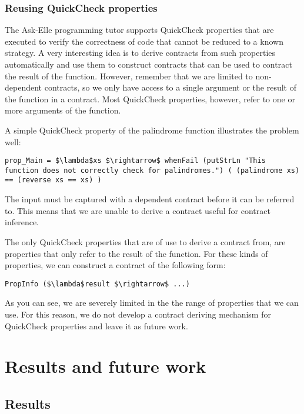 \documentclass[10pt]{report}
\newcommand{\code}[1]{%
  {%
   \setlength{\fboxsep}{-2\fboxrule}%
   \fcolorbox{black}{light-gray}{\hspace{1.5pt}\strut\texttt{#1}\hspace{1.5pt}}%
  }%
}
\begin{document}
{\subsection{Reusing QuickCheck properties}
\label{subsection:reusing-qc-props}

The Ask-Elle programming tutor supports QuickCheck properties that are executed to verify the correctness of code that cannot be reduced to a known strategy.
A very interesting idea is to derive contracts from such properties automatically and use them to construct contracts that can be used to contract the result of the function.
However, remember that we are limited to non-dependent contracts, so we only have access to a single argument or the result of the function in a contract.
Most QuickCheck properties, however, refer to one or more arguments of the function.

A simple QuickCheck property of the palindrome function illustrates the problem well:

\begin{lstlisting}[mathescape]
prop_Main = $\lambda$xs $\rightarrow$ whenFail (putStrLn "This function does not correctly check for palindromes.") ( (palindrome xs) == (reverse xs == xs) )  
\end{lstlisting}

The input \code{xs} must be captured with a dependent contract before it can be referred to.
This means that we are unable to derive a contract useful for contract inference.

The only QuickCheck properties that are of use to derive a contract from, are properties that only refer to the result of the function.
For these kinds of properties, we can construct a contract of the following form:

\begin{lstlisting}[mathescape]
PropInfo ($\lambda$result $\rightarrow$ ...)
\end{lstlisting}

As you can see, we are severely limited in the the range of properties that we can use.
For this reason, we do not develop a contract deriving mechanism for QuickCheck properties and leave it as future work.

\chapter{Results and future work}
\label{futurework}

\section{Results}

}
\end{document}
